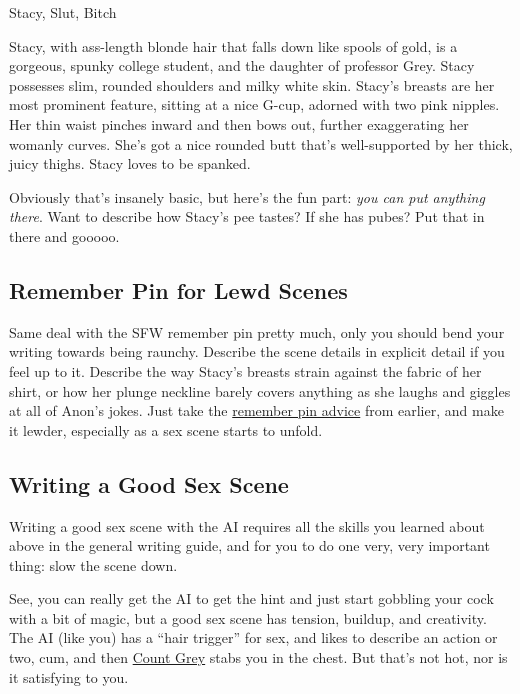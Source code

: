 \documentclass[Avsfag-main.tex]{subfiles}
\begin{document}
\begin{WI}{Stacy, Slut, Bitch}

Stacy, with ass-length blonde hair that falls down like spools of gold, is a gorgeous, spunky college student, and the daughter of professor Grey.
Stacy possesses slim, rounded shoulders and milky white skin.
Stacy's breasts are her most prominent feature, sitting at a nice G-cup, adorned with two pink nipples.
Her thin waist pinches inward and then bows out, further exaggerating her womanly curves.
She's got a nice rounded butt that's well-supported by her thick, juicy thighs.
Stacy loves to be spanked.

\end{WI}

Obviously that's insanely basic, but here's the fun part: \emph{you can put anything there}.
Want to describe how Stacy's pee tastes?
If she has pubes?
Put that in there and gooooo.

\subsection{Remember Pin for Lewd Scenes}

Same deal with the SFW remember pin pretty much, only you should bend your writing towards being raunchy. Describe the scene details in explicit detail if you feel up to it.
Describe the way Stacy's breasts strain against the fabric of her shirt, or how her plunge neckline barely covers anything as she laughs and giggles at all of Anon's jokes.
Just take the \hyperref[ch:rm]{remember pin advice} from earlier, and make it lewder, especially as a sex scene starts to unfold.

\subsection{Writing a Good Sex Scene}

Writing a good sex scene with the AI requires all the skills you learned about above in the general writing guide, and for you to do one very, very important thing: slow the scene down.

See, you can really get the AI to get the hint and just start gobbling your cock with a bit of \story magic, but a good sex scene has tension, buildup, and creativity.
The AI (like you) has a ``hair trigger'' for sex, and likes to describe an action or two, cum, and then \hyperref[ch:qa]{Count Grey} stabs you in the chest.
But that's not hot, nor is it satisfying to you.
\end{document}
